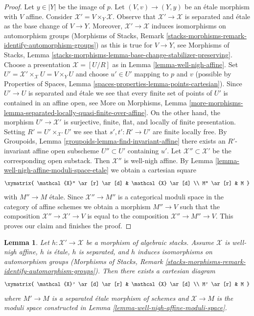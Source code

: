 \documentclass[10pt,a4paper]{amsart}
\theoremstyle{plain}
\newtheorem{lemma}[subsection]{Lemma}
\theoremstyle{definition}
\theoremstyle{remark}
\numberwithin{equation}{subsection}
\begin{document}
\begin{proof}
\medskip\noindent
Let $y \in |Y|$ be the image of $p$.
Let $(V, v) \to (Y, y)$ be an \'etale morphism with $V$ affine.
Consider $\mathcal{X}' = V \times_Y \mathcal{X}$.
Observe that $\mathcal{X}' \to \mathcal{X}$ is separated and \'etale
as the base change of $V \to Y$. Moreover, $\mathcal{X}' \to \mathcal{X}$
induces isomorphisms on automorphism groups
(Morphisms of Stacks, Remark
\ref{stacks-morphisms-remark-identify-automorphism-groups})
as this is true for
$V \to Y$, see Morphisms of Stacks, Lemma
\ref{stacks-morphisms-lemma-base-change-stabilizer-preserving}.
Choose a presentation $\mathcal{X} = [U/R]$
as in Lemma \ref{lemma-well-nigh-affine}.
Set $U' = \mathcal{X}' \times_\mathcal{X} U = V \times_Y U$
and choose $u' \in U'$ mapping to $p$ and $v$ (possible
by Properties of Spaces, Lemma \ref{spaces-properties-lemma-points-cartesian}).
Since $U' \to U$ is separated and \'etale we see that
every finite set of points of $U'$ is contained in an affine open, see
More on Morphisms, Lemma
\ref{more-morphisms-lemma-separated-locally-quasi-finite-over-affine}.
On the other hand, the morphism $U' \to \mathcal{X}'$ is
surjective, finite, flat, and locally of finite presentation.
Setting $R' = U' \times_{\mathcal{X}'} U'$ we see
that $s', t' : R' \to U'$ are finite locally free.
By Groupoids, Lemma \ref{groupoids-lemma-find-invariant-affine}
there exists an $R'$-invariant affine open subscheme $U'' \subset U'$
containing $u'$.
Let $\mathcal{X}'' \subset \mathcal{X}'$ be
the corresponding open substack. Then $\mathcal{X}''$ is
well-nigh affine. By Lemma \ref{lemma-well-nigh-affine-moduli-space-etale}
we obtain a cartesian square
$$
\xymatrix{
\mathcal{X}'' \ar[r] \ar[d] & \mathcal{X} \ar[d] \\
M'' \ar[r] & M
}
$$
with $M'' \to M$ \'etale. Since $\mathcal{X}'' \to M''$ is
a categorical moduli space in the category of affine schemes
we obtain a morphism $M'' \to V$ such that the composition
$\mathcal{X}'' \to \mathcal{X}' \to V$ is equal to the composition
$\mathcal{X}'' \to M'' \to V$. This proves our claim and finishes
the proof.
\end{proof}

\begin{lemma}
\label{lemma-etale-separated-over-well-nigh-affine}
Let $h : \mathcal{X}' \to \mathcal{X}$ be a morphism of algebraic stacks.
Assume $\mathcal{X}$ is well-nigh affine, $h$ is \'etale, $h$ is separated,
and $h$ induces isomorphisms on automorphism groups
(Morphisms of Stacks, Remark
\ref{stacks-morphisms-remark-identify-automorphism-groups}).
Then there exists a cartesian diagram
$$
\xymatrix{
\mathcal{X}' \ar[d] \ar[r] & \mathcal{X} \ar[d] \\
M' \ar[r] & M
}
$$
where $M' \to M$ is a separated \'etale morphism of schemes and
$\mathcal{X} \to M$ is the moduli space constructed in
Lemma \ref{lemma-well-nigh-affine-moduli-space}.
\end{lemma}
\end{document}

